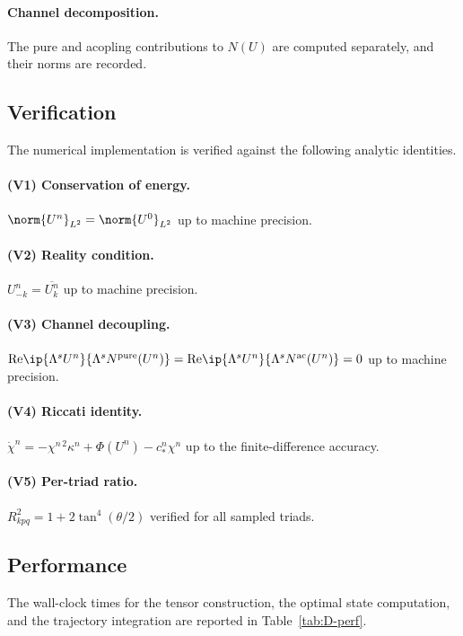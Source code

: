 \paragraph{Channel decomposition.}
The pure and acopling contributions to $N(U)$ are computed 
separately, and their norms are recorded.

\subsection{Verification}
\label{ssec:D-verify}

The numerical implementation is verified against the following 
analytic identities.

\paragraph{(V1) Conservation of energy.}
$\norm{U^n}_{L^2} = \norm{U^0}_{L^2}$ up to machine precision.

\paragraph{(V2) Reality condition.}
$U^n_{-k} = \overline{U^n_k}$ up to machine precision.

\paragraph{(V3) Channel decoupling.}
$\mathrm{Re}\ip{\Lambda^s U^n}{\Lambda^s N^{\mathrm{pure}}(U^n)} = 
\mathrm{Re}\ip{\Lambda^s U^n}{\Lambda^s N^{\mathrm{ac}}(U^n)} = 0$ 
up to machine precision.

\paragraph{(V4) Riccati identity.}
$\dot\chi^n = -\chi^{n\,2}\kappa^n + \Phi(U^n) - 
c_\ast^n\chi^n$ up to the finite-difference accuracy.

\paragraph{(V5) Per-triad ratio.}
$R_{kpq}^2 = 1 + 2\tan^4(\theta/2)$ verified for all sampled triads.

\subsection{Performance}
\label{ssec:D-perf}

The wall-clock times for the tensor construction, the optimal state 
computation, and the trajectory integration are reported in 
Table~\ref{tab:D-perf}.

